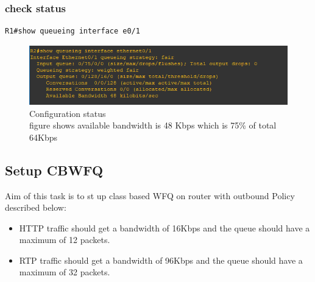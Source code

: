 \documentclass[paper=letter, fontsize=12pt]{article}
\begin{document}
\subsubsection{check status}
\begin{verbatim}
R1#show queueing interface e0/1
\end{verbatim}

\begin{figure}[H]
	\includegraphics[width=450px]{refs/sh-status}
	\caption{Configuration status \\figure shows available bandwidth is 48 Kbps which is 75\% of total 64Kbps}
\end{figure}



\subsection{Setup CBWFQ}
Aim of this task is to st up class based WFQ on router with outbound Policy described below:
\begin{itemize}
	\item HTTP traffic should get a bandwidth of 16Kbps and the queue should have a maximum of 12 packets.
	\item RTP traffic should get a bandwidth of 96Kbps and the queue should have a maximum of 32 packets.
\end{itemize}
\end{document}
